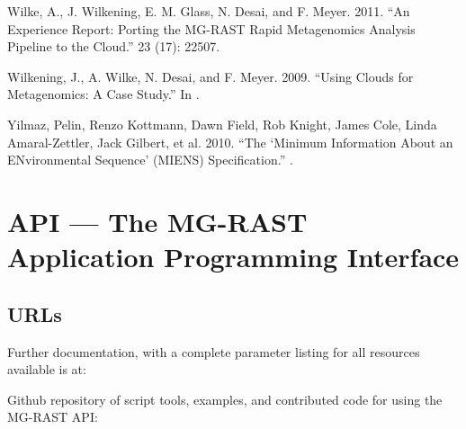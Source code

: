 \documentclass[letterpaper,10pt,english]{sphinxmanual}
\begin{document}
Wilke, A., J. Wilkening, E. M. Glass, N. Desai, and F. Meyer.
2011. “An Experience Report: Porting the MG-RAST Rapid
Metagenomics Analysis Pipeline to the Cloud.”  23 (17): 2250\textendash{}7.

Wilkening, J., A. Wilke, N. Desai, and F. Meyer. 2009. “Using
Clouds for Metagenomics: A Case Study.” In .

Yilmaz, Pelin, Renzo Kottmann, Dawn Field, Rob Knight, James Cole,
Linda Amaral-Zettler, Jack Gilbert, et al. 2010. “The ‘Minimum
Information About an ENvironmental Sequence’ (MIENS)
Specification.” .


\chapter{API — The MG-RAST Application Programming Interface}
\label{\detokenize{api:api-the-mg-rast-application-programming-interface}}\label{\detokenize{api:api}}\label{\detokenize{api::doc}}

\section{URLs}
\label{\detokenize{api:urls}}
\begin{sphinxVerbatim}[commandchars=\\\{\}]
\end{sphinxVerbatim}

Further documentation, with a complete parameter listing for all
resources available is at:

\begin{sphinxVerbatim}[commandchars=\\\{\}]
\end{sphinxVerbatim}

Github repository of script tools, examples, and contributed code for
using the MG-RAST API:

\begin{sphinxVerbatim}[commandchars=\\\{\}]
\end{sphinxVerbatim}
\end{document}
